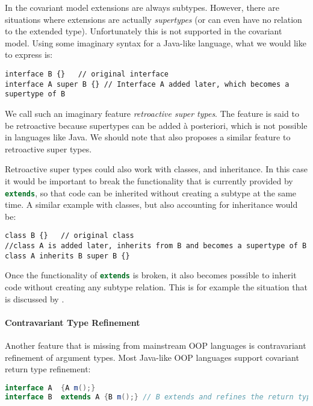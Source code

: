 In the covariant model extensions are always subtypes. However, 
there are situations where extensions are actually
\emph{supertypes} (or can even have no relation to the extended type). Unfortunately this is not supported in the
covariant model. Using some imaginary syntax for a Java-like language, 
what we would like to express is:

\begin{lstlisting}
interface B {}   // original interface
interface A super B {} // Interface A added later, which becomes a supertype of B
\end{lstlisting}

\noindent We call such an imaginary feature \emph{retroactive super types}. The
feature is said to be retroactive because supertypes can be added \`a
posteriori, which is not possible in languages like Java. We should note that
\citet{ostermann2008nominal} also proposes a similar feature to retroactive
super types.

Retroactive super types could also work with classes, and
inheritance. In this case it would be important to break the
functionality that is currently provided by \lstinline[language=java]{extends}, so that
code can be inherited without creating a subtype at the same time. 
A similar example with classes, but also accounting for inheritance 
would be:

\begin{lstlisting}
class B {}   // original class
//class A is added later, inherits from B and becomes a supertype of B
class A inherits B super B {}
\end{lstlisting}

\noindent Once the functionality of \lstinline[language=java]{extends} is broken, it also
becomes possible to inherit code without creating any subtype
relation. This is for example the situation that is discussed by \citet{cook1989inheritance}.

\paragraph{Contravariant Type Refinement}
Another feature that is missing from mainstream OOP languages is 
contravariant refinement of argument types. Most Java-like OOP languages support covariant return type 
refinement:

\begin{lstlisting}[language=java]
interface A  {A m();} 
interface B  extends A {B m();} // B extends and refines the return type of m() to a subtype
\end{lstlisting}

